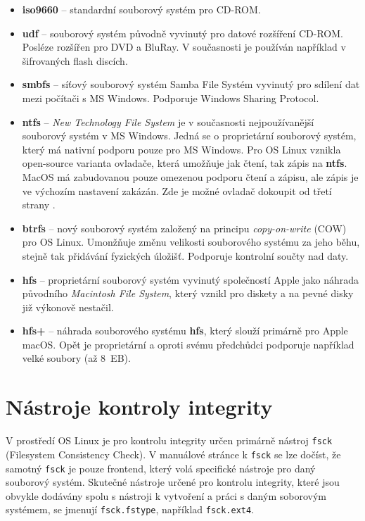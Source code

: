 \begin{itemize}
    \item \textbf{iso9660} -- standardní souborový systém pro CD-ROM. 
    \item \textbf{udf} -- souborový systém původně vyvinutý pro datové rozšíření CD-ROM. Posléze rozšířen pro DVD a BluRay. V současnosti je používán například v šifrovaných flash discích. 
    \item \textbf{smbfs} -- síťový souborový systém Samba File Systém vyvinutý pro sdílení dat mezi počítači s MS Windows. Podporuje Windows Sharing Protocol.
    \item \textbf{ntfs} -- \textit{New Technology File System} je v současnosti nejpoužívanější souborový systém v MS Windows. Jedná se o proprietární souborový systém, který má nativní podporu pouze pro MS Windows. Pro OS Linux vznikla open-source varianta ovladače, která umožňuje jak čtení, tak zápis na \textbf{ntfs}. MacOS má zabudovanou pouze omezenou podporu čtení a zápisu, ale zápis je ve výchozím nastavení zakázán. Zde je možné ovladač dokoupit od třetí strany \cite{paragon-ntfs}.
    \item \textbf{btrfs} -- nový souborový systém založený na principu \textit{copy-on-write} (COW) pro OS Linux. Umonžňuje změnu velikosti souborového systému za jeho běhu, stejně tak přidávání fyzických úložišť. Podporuje kontrolní součty nad daty.
    \item \textbf{hfs} -- proprietární souborový systém vyvinutý společností Apple jako náhrada původního \textit{Macintosh File System}, který vznikl pro diskety a na pevné disky již výkonově nestačil.
    \item \textbf{hfs+} -- náhrada souborového systému \textbf{hfs}, který slouží primárně pro Apple macOS. Opět je proprietární a oproti svému předchůdci podporuje například velké soubory (až 8~EB).
\end{itemize}

\section{Nástroje kontroly integrity}
V prostředí OS Linux je pro kontrolu integrity určen primárně nástroj \texttt{fsck} (Filesystem Consistency Check). V manuálové stránce k \texttt{fsck} \cite{man-fsck} se lze dočíst, že samotný \texttt{fsck} je pouze frontend, který volá specifické nástroje pro daný souborový systém. Skutečné nástroje určené pro kontrolu integrity, které jsou obvykle dodávány spolu s nástroji k vytvoření a práci s daným soborovým systémem, se jmenují \texttt{fsck.fstype}, například \texttt{fsck.ext4}.

